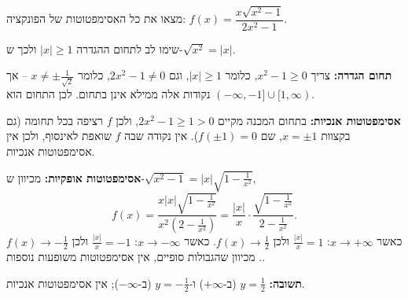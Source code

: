 
\begin{question}
מצאו את כל האסימפטוטות של הפונקציה: $f(x)=\dfrac{x\sqrt{x^2-1}}{2x^2-1}$.
\end{question}

\begin{hint}
שימו לב לתחום ההגדרה $|x|\ge1$ ולכך ש-$\sqrt{x^2}=|x|$.
\end{hint}

\begin{solution}
\textbf{תחום הגדרה:} צריך $x^2-1\ge0$, כלומר $|x|\ge1$, וגם $2x^2-1\ne0$, כלומר $x\ne\pm\frac1{\sqrt2}$ – אך נקודות אלה ממילא אינן בתחום. לכן התחום הוא $(-\infty,-1]\cup[1,\infty)$.

\textbf{אסימפטוטות אנכיות:} בתחום המכנה מקיים $2x^2-1\ge1>0$, ולכן $f$ רציפה בכל תחומה (גם בקצוות $x=\pm1$, שם $f(\pm1)=0$). אין נקודה שבה $f$ שואפת לאינסוף, ולכן אין אסימפטוטות אנכיות.

\textbf{אסימפטוטות אופקיות:} מכיוון ש-$\sqrt{x^2-1}=|x|\sqrt{1-\frac1{x^2}}$,
\[ f(x)=\frac{x|x|\sqrt{1-\frac1{x^2}}}{x^2\left(2-\frac1{x^2}\right)}=\frac{|x|}{x}\cdot\frac{\sqrt{1-\frac1{x^2}}}{2-\frac1{x^2}}. \]
כאשר $x\to+\infty$: $\frac{|x|}{x}=1$ ולכן $f(x)\to\frac12$. כאשר $x\to-\infty$: $\frac{|x|}{x}=-1$ ולכן $f(x)\to-\frac12$. מכיוון שהגבולות סופיים, אין אסימפטוטות משופעות נוספות.

\textbf{תשובה:} $y=\frac12$ (ב-$+\infty$) ו-$y=-\frac12$ (ב-$-\infty$); אין אסימפטוטות אנכיות.
\end{solution}
